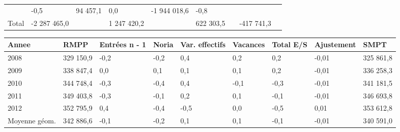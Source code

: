 \begin{longtable}[]{@{}lllllllll@{}}
\begin{minipage}[t]{0.16\columnwidth}
\end{minipage} & \begin{minipage}[t]{0.06\columnwidth}\raggedright
-0,5\strut
\end{minipage} & \begin{minipage}[t]{0.12\columnwidth}\raggedright
94 457,1\strut
\end{minipage} & \begin{minipage}[t]{0.06\columnwidth}\raggedright
0,0\strut
\end{minipage} & \begin{minipage}[t]{0.10\columnwidth}\raggedright
-1 944 018,6\strut
\end{minipage} & \begin{minipage}[t]{0.06\columnwidth}\raggedright
-0,8\strut
\end{minipage}\tabularnewline
\begin{minipage}[t]{0.05\columnwidth}\raggedright
Total\strut
\end{minipage} & \begin{minipage}[t]{0.10\columnwidth}\raggedright
-2 287 465,0\strut
\end{minipage} & \begin{minipage}[t]{0.06\columnwidth}\raggedright
\strut
\end{minipage} & \begin{minipage}[t]{0.16\columnwidth}\raggedright
1 247 420,2\strut
\end{minipage} & \begin{minipage}[t]{0.06\columnwidth}\raggedright
\strut
\end{minipage} & \begin{minipage}[t]{0.12\columnwidth}\raggedright
622 303,5\strut
\end{minipage} & \begin{minipage}[t]{0.06\columnwidth}\raggedright
\strut
\end{minipage} & \begin{minipage}[t]{0.10\columnwidth}\raggedright
-417 741,3\strut
\end{minipage} & \begin{minipage}[t]{0.06\columnwidth}\raggedright
\strut
\end{minipage}\tabularnewline
\bottomrule
\end{longtable}

\begin{longtable}[]{@{}lllllllll@{}}
\toprule
Annee & RMPP & Entrées n - 1 & Noria & Var. effectifs & Vacances & Total
E/S & Ajustement & SMPT\tabularnewline
\midrule
\endhead
2008 & 329 150,9 & -0,2 & -0,2 & 0,4 & 0,2 & 0,2 & -0,01 & 325
861,8\tabularnewline
2009 & 338 847,4 & 0,0 & 0,1 & 0,1 & 0,1 & 0,2 & -0,01 & 336
258,3\tabularnewline
2010 & 344 748,4 & -0,3 & -0,4 & 0,4 & -0,1 & -0,3 & -0,01 & 341
181,5\tabularnewline
2011 & 349 403,8 & -0,3 & -0,1 & 0,2 & 0,1 & -0,1 & -0,01 & 346
693,8\tabularnewline
2012 & 352 795,9 & 0,4 & -0,4 & -0,5 & 0,0 & -0,5 & 0,01 & 353
612,8\tabularnewline
Moyenne géom. & 342 886,6 & -0,1 & -0,2 & 0,1 & 0,1 & -0,1 & -0,01 & 340
591,0\tabularnewline
\bottomrule
\end{longtable}

